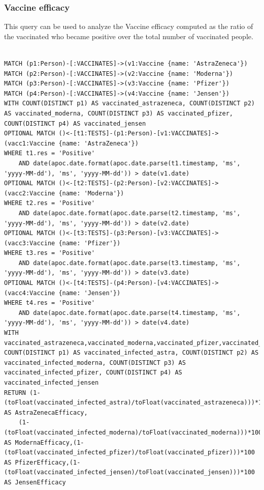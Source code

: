 \documentclass{article}
\begin{document}
\subsubsection{Vaccine efficacy}
This query can be used to analyze the Vaccine efficacy computed as the ratio of the vaccinated who became positive over the total number of vaccinated people.

\begin{lstlisting}[language=cypher, label=lst:cypher-example]

MATCH (p1:Person)-[:VACCINATES]->(v1:Vaccine {name: 'AstraZeneca'})
MATCH (p2:Person)-[:VACCINATES]->(v2:Vaccine {name: 'Moderna'})
MATCH (p3:Person)-[:VACCINATES]->(v3:Vaccine {name: 'Pfizer'})
MATCH (p4:Person)-[:VACCINATES]->(v4:Vaccine {name: 'Jensen'})
WITH COUNT(DISTINCT p1) AS vaccinated_astrazeneca, COUNT(DISTINCT p2) AS vaccinated_moderna, COUNT(DISTINCT p3) AS vaccinated_pfizer, COUNT(DISTINCT p4) AS vaccinated_jensen
OPTIONAL MATCH ()<-[t1:TESTS]-(p1:Person)-[v1:VACCINATES]->(vacc1:Vaccine {name: 'AstraZeneca'})
WHERE t1.res = 'Positive'
    AND date(apoc.date.format(apoc.date.parse(t1.timestamp, 'ms', 'yyyy-MM-dd'), 'ms', 'yyyy-MM-dd')) > date(v1.date)
OPTIONAL MATCH ()<-[t2:TESTS]-(p2:Person)-[v2:VACCINATES]->(vacc2:Vaccine {name: 'Moderna'})
WHERE t2.res = 'Positive'
    AND date(apoc.date.format(apoc.date.parse(t2.timestamp, 'ms', 'yyyy-MM-dd'), 'ms', 'yyyy-MM-dd')) > date(v2.date)
OPTIONAL MATCH ()<-[t3:TESTS]-(p3:Person)-[v3:VACCINATES]->(vacc3:Vaccine {name: 'Pfizer'})
WHERE t3.res = 'Positive'
    AND date(apoc.date.format(apoc.date.parse(t3.timestamp, 'ms', 'yyyy-MM-dd'), 'ms', 'yyyy-MM-dd')) > date(v3.date)
OPTIONAL MATCH ()<-[t4:TESTS]-(p4:Person)-[v4:VACCINATES]->(vacc4:Vaccine {name: 'Jensen'})
WHERE t4.res = 'Positive'
    AND date(apoc.date.format(apoc.date.parse(t4.timestamp, 'ms', 'yyyy-MM-dd'), 'ms', 'yyyy-MM-dd')) > date(v4.date)
WITH vaccinated_astrazeneca,vaccinated_moderna,vaccinated_pfizer,vaccinated_jensen, COUNT(DISTINCT p1) AS vaccinated_infected_astra, COUNT(DISTINCT p2) AS vaccinated_infected_moderna, COUNT(DISTINCT p3) AS vaccinated_infected_pfizer, COUNT(DISTINCT p4) AS vaccinated_infected_jensen
RETURN (1- (toFloat(vaccinated_infected_astra)/toFloat(vaccinated_astrazeneca)))*100 AS AstraZenecaEfficacy,
    (1- (toFloat(vaccinated_infected_moderna)/toFloat(vaccinated_moderna)))*100 AS ModernaEfficacy,(1- (toFloat(vaccinated_infected_pfizer)/toFloat(vaccinated_pfizer)))*100 AS PfizerEfficacy,(1- (toFloat(vaccinated_infected_jensen)/toFloat(vaccinated_jensen)))*100 AS JensenEfficacy
\end{lstlisting}
\end{document}
